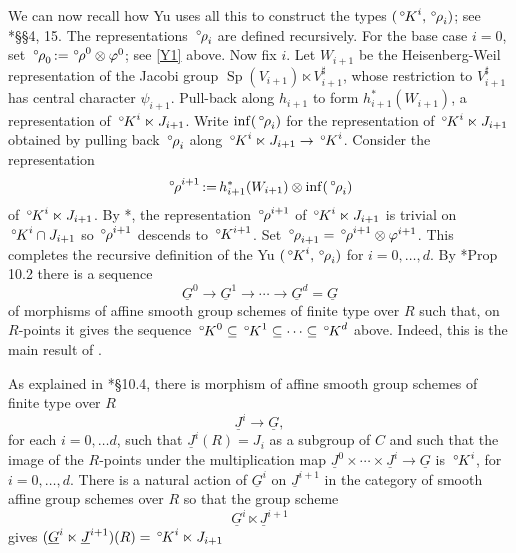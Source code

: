 \documentclass[10pt]{amsart}
\theoremstyle{plain}
\theoremstyle{definition}
\newcommand{\ceq}{{\, :=\, }}
\newcommand{\Sp}{{\operatorname{Sp}}}
\newcommand{\oK}{{\,^\circ \hskip-1pt K}}
\newcommand{\orho}{{\,^\circ \hskip-1pt \rho}}
\begin{document}
We can now recall how Yu uses all this to construct the types $(\oK^i,\orho_i)$; see \cite{yu:01a}*{\S\S 4, 15}.
The representations $\orho_i$ are defined recursively.
For the base case $i=0$, set $\orho_0 \ceq \orho^0\otimes \varphi^0$; see \ref{Y1} above.
Now fix $i$.
Let $W_{i+1}$ be the Heisenberg-Weil representation of the Jacobi group $\Sp(V_{i+1})\ltimes V_{i+1}^\sharp$, whose restriction to $V_{i+1}^\sharp$ has central character $\psi_{i+1}$.
Pull-back along $h_{i+1}$ to form $h_{i+1}^*(W_{i+1})$, a representation of $\oK^i \ltimes J_{i+1}$.
Write $\inf(\orho_i)$ for the representation of $\oK^i \ltimes J_{i+1}$ obtained by pulling back $\orho_i$ along $\oK^i \ltimes J_{i+1} \to \oK^i$. 
Consider the representation
\begin{equation}\label{eq:tensor}
\orho^{i+1} \ceq h_{i+1}^*(W_{i+1}) \otimes \inf(\orho_i)
\end{equation}
of $\oK^i \ltimes J_{i+1}$.
By \cite{yu:01a}*{}, the representation $\orho^{i+1}$ of $\oK^i \ltimes J_{i+1}$ is trivial on $\oK^{i}\cap J_{i+1}$ so $\orho^{i+1}$ descends to $\oK^{i+1}$. 
%
Set $\orho_{i+1} = \orho^{i+1}\otimes \varphi^{i+1}$.
This completes the recursive definition of the Yu $(\oK^i,\orho_i)$ for $i=0, \ldots , d$.
By \cite{Yu:models}*{Prop 10.2} there is a sequence  
\[
\underline{G}^0 \to \underline{G}^1 \to \cdots \to \underline{G}^d = \underline{G}
\]
of morphisms of affine smooth group schemes of finite type over $R$ such that, on $R$-points it gives the sequence $\oK^0 \subseteq \oK^1 \subseteq \cdots \subseteq \oK^d$ above.
Indeed, this is the main result of \cite{Yu:models}.

As explained in \cite{Yu:models}*{\S 10.4}, there is morphism of affine smooth group schemes of finite type over $R$ 
\[
\underline{J}^i \to \underline{G},
\] 
for each $i=0,\ldots d$, such that $\underline{J}^i(R) = J_i$ as a subgroup of $C$ and such that the image of the $R$-points under the multiplication map $\underline{J}^0 \times \cdots \times \underline{J}^i \to \underline{G}$ is $\oK^i$, for $i=0, \ldots , d$.
There is a natural action of $\underline{G}^i$ on $\underline{J}^{i+1}$ in the category of smooth affine group schemes over $R$ so that the group scheme
\[
\underline{G}^i \ltimes \underline{J}^{i+1}
\]
gives $(\underline{G}^i \ltimes \underline{J}^{i+1})(R) = \oK^i \ltimes J_{i+1}$

\newcommand{\reductive}{{\operatorname{red}}}
\end{document}
